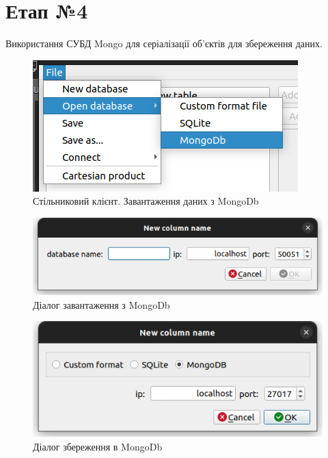 \documentclass[a4paper, 12pt]{article}
\begin{document}
\section{Етап №4}
Використання  СУБД Mongo для серіалізації об'єктів для збереження даних.

\begin{figure}[H]
\centering
\includegraphics[scale=0.8]{resources/MongoDbLoadMenu.png}
\caption{Стільниковий клієнт. Завантаження даних з MongoDb}
\end{figure} 

\begin{figure}[H]
\centering
\includegraphics[scale=0.8]{resources/MongoDbLoadDialog.png}
\caption{Діалог завантаження з MongoDb}
\end{figure} 

\begin{figure}[H]
\centering
\includegraphics[scale=0.8]{resources/MongoDbSaveDialog.png}
\caption{Діалог збереження в MongoDb}
\end{figure} 
\end{document}
